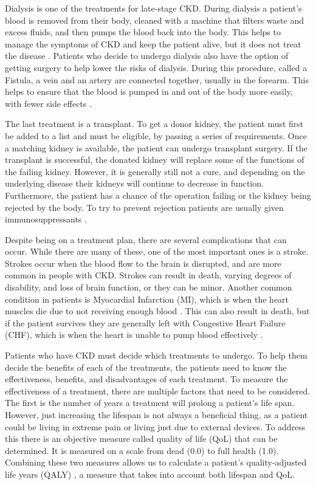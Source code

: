 \documentclass[10pt,twocolumn]{article}
\begin{document}
Dialysis is one of the treatments for late-stage CKD. During dialysis a patient's blood is removed from their body, cleaned with a machine that filters waste and excess fluids, and then pumps the blood back into the body. This helps to manage the symptoms of CKD and keep the patient alive, but it does not treat the disease \cite{survival}. Patients who decide to undergo dialysis also have the option of getting surgery to help lower the risks of dialysis. During this procedure, called a Fistula, a vein and an artery are connected together, usually in the forearm. This helps to ensure that the blood is pumped in and out of the body more easily, with fewer side effects \cite{Chronic}.

The last treatment is a transplant. To get a donor kidney, the patient must first be added to a list and must be eligible, by passing a series of requirements. Once a matching kidney is available, the patient can undergo transplant surgery. If the transplant is successful, the donated kidney will replace some of the functions of the failing kidney. However, it is generally still not a cure, and depending on the underlying disease their kidneys will continue to decrease in function. Furthermore, the patient has a chance of the operation failing or the kidney being rejected by the body. To try to prevent rejection patients are usually given immunosuppressants \cite{Chronic}.

Despite being on a treatment plan, there are several complications that can occur. While there are many of these, one of the most important ones is a stroke. Strokes occur when the blood flow to the brain is disrupted, and are more common in people with CKD. Strokes can result in death, varying degrees of disability, and loss of brain function, or they can be minor. Another common condition in patients is Myocardial Infarction (MI), which is when the heart muscles die due to not receiving enough blood \cite{long-term}. This can also result in death, but if the patient survives they are generally left with Congestive Heart Failure (CHF), which is when the heart is unable to pump blood effectively \cite{ckdmodel}.

Patients who have CKD must decide which treatments to undergo. To help them decide the benefits of each of the treatments, the patients need to know the effectiveness, benefits, and disadvantages of each treatment. To measure the effectiveness of a treatment, there are multiple factors that need to be considered. The first is the number of years a treatment will prolong a patient's life span. However, just increasing the lifespan is not always a beneficial thing, as a patient could be living in extreme pain or living just due to external devices. To address this there is an objective measure called quality of life (QoL) that can be determined. It is measured on a scale from dead (0.0) to full health (1.0). Combining these two measures allows us to calculate a patient's quality-adjusted life years (QALY) \cite{ckdmodel}, a measure that takes into account both lifespan and QoL.
\end{document}
